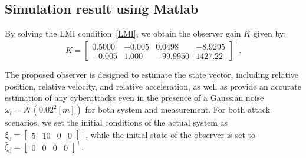 {\subsection{Simulation result using Matlab}

By solving the LMI condition~\eqref{LMI}, we obtain the observer gain $K$ given by: 
\begin{equation*}
    K =\begin{bmatrix}
        0.5000 & -0.005 & 0.0498 & -8.9295 \\
        -0.005 & 1.000 & -99.9950 & 1427.22 
      \end{bmatrix}^{\top}.
\end{equation*} 

The proposed observer is designed to estimate the state vector, including relative position, relative velocity, and relative acceleration, as well as provide an accurate estimation of any cyberattacks even in the presence of a  Gaussian noise $\omega_{t} = \mathcal{N}(0.02^2[m])$ for both system and measurement.
For both attack scenarios, we set the initial conditions of the actual system as ${\xi}_{0} = \begin{bmatrix} 5 & 10 & 0 & 0
\end{bmatrix}^{\top}$, while the initial state of the observer is set to ${\hat{\xi}}_{0} = \begin{bmatrix}0 & 0 & 0 & 0\end{bmatrix}^{\top}$.

}
